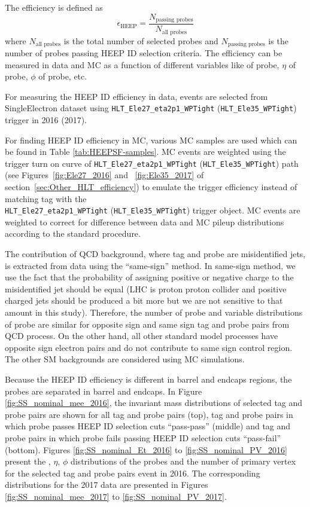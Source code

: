 The efficiency is defined as
\begin{equation}
\label{SF:eq:eff}
\epsilon_{\text{HEEP}} = \frac{N_{\text{passing probes}}}{N_{\text{all probes}}}
\end{equation}
where $N_{\text{all probes}}$ is the total number of selected probes and $N_{\text{passing probes}}$ is the number of probes passing HEEP ID selection criteria. The efficiency can be measured in data and MC as a function of different variables like \et of probe, $\eta$ of probe, $\phi$ of probe, etc.

For measuring the HEEP ID efficiency in data, events are selected from SingleElectron dataset using \texttt{HLT\_Ele27\_eta2p1\_WPTight} (\texttt{HLT\_Ele35\_WPTight}) trigger in 2016 (2017).

For finding HEEP ID efficiency in MC, various MC samples are used which can be found in Table \ref{tab:HEEPSF-samples}. MC events are weighted using the trigger turn on curve of \texttt{HLT\_Ele27\_eta2p1\_WPTight} (\texttt{HLT\_Ele35\_WPTight}) path (see Figures~\ref{fig:Ele27_2016} and ~\ref{fig:Ele35_2017} of section~\ref{sec:Other_HLT_efficiency}) to emulate the trigger efficiency instead of matching tag with the \\
\texttt{HLT\_Ele27\_eta2p1\_WPTight} (\texttt{HLT\_Ele35\_WPTight}) trigger object.
MC events are weighted to correct for difference between data and MC pileup distributions according to the standard procedure.

The contribution of QCD background, where tag and probe are misidentified jets, is extracted from data using the ``same-sign'' method.
In same-sign method, we use the fact that the probability of assigning positive or negative charge to the misidentified jet should be equal (LHC is proton proton collider and positive charged jets should be produced a bit more but we are not sensitive to that amount in this study).
Therefore, the number of probe and variable distributions of probe are similar for opposite sign and same sign tag and probe pairs from QCD process. On the other hand, all other standard model processes have opposite sign electron pairs and do not contribute to same sign control region. The other SM backgrounds are considered using MC simulations.

Because the HEEP ID efficiency is different in barrel and endcaps regions, the probes are separated in barrel and endcaps.
In Figure \ref{fig:SS_nominal_mee_2016}, the invariant mass distributions of selected tag and probe pairs are shown for all tag and probe pairs (top), tag and probe pairs in which probe passes HEEP ID selection cuts ``pass-pass'' (middle) and tag and probe pairs in which probe fails passing  HEEP ID selection cuts ``pass-fail'' (bottom). Figures \ref{fig:SS_nominal_Et_2016} to \ref{fig:SS_nominal_PV_2016} present the \et, $\eta$, $\phi$ distributions of the probes and the number of primary vertex for the selected tag and probe pairs event in 2016.
The corresponding distributions for the 2017 data are presented in Figures \ref{fig:SS_nominal_mee_2017} to \ref{fig:SS_nominal_PV_2017}.

